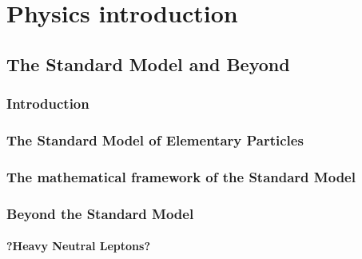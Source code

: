 \part{Physics introduction}
\chapter{The Standard Model and Beyond} %

\label{Chapter1} %


\section{Introduction}

\section{The Standard Model of Elementary Particles}
\section{The mathematical framework of the Standard Model}

\clearpage

\section{Beyond the Standard Model}
\subsection{?Heavy Neutral Leptons?}
